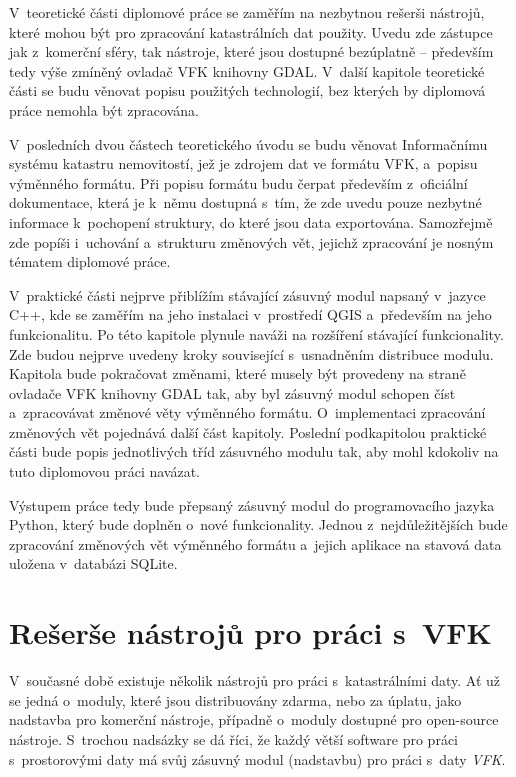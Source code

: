 \documentclass[a4paper,12pt,oneside]{book}
\begin{document}
V~teoretické části diplomové práce se zaměřím na nezbytnou rešerši nástrojů, které mohou být pro zpracování katastrálních dat použity. Uvedu zde zástupce jak z~komerční sféry, tak nástroje, které jsou dostupné bezúplatně -- především  tedy výše zmíněný ovladač VFK knihovny GDAL. V~další kapitole teoretické části se budu věnovat popisu použitých technologií, bez kterých by diplomová práce nemohla být zpracována. 

V~posledních dvou částech teoretického úvodu se budu věnovat Informačnímu systému katastru nemovitostí, jež je zdrojem dat ve formátu VFK, a~popisu výměnného formátu. Při popisu formátu budu čerpat především z~oficiální dokumentace, která je k~němu dostupná s~tím, že zde uvedu pouze nezbytné informace k~pochopení struktury, do které jsou data exportována. Samozřejmě zde popíši i~uchování a~strukturu změnových vět, jejichž zpracování je nosným tématem diplomové práce.

V~praktické části nejprve přiblížím stávající zásuvný modul napsaný v~jazyce C++, kde se zaměřím na jeho instalaci v~prostředí QGIS a~především na jeho funkcionalitu. Po této kapitole plynule naváži na rozšíření stávající funkcionality. Zde budou nejprve uvedeny kroky související s~usnadněním distribuce modulu. Kapitola bude pokračovat změnami, které musely být provedeny na straně ovladače VFK knihovny GDAL tak, aby byl zásuvný modul schopen číst a~zpracovávat změnové věty výměnného formátu. O~implementaci zpracování změnových vět pojednává dal\-ší část kapitoly. Poslední podkapitolou praktické části bude popis jednotlivých tříd zásuvného modulu tak, aby mohl kdokoliv na tuto diplomovou práci navázat.

Výstupem práce tedy bude přepsaný zásuvný modul do programovacího jazyka Python, který bude doplněn o~nové funkcionality. Jednou z~nejdůležitějších bude zpracování změnových vět výměnného formátu a~jejich aplikace na stavová data uložena v~databázi SQLite.


\clearpage
\rhead{{\rightmark}}
\chapter{Rešerše nástrojů pro práci s~VFK}

V~současné době existuje několik nástrojů pro práci s~katastrálními daty. Ať už se jedná o~moduly, které jsou distribuovány zdarma, nebo za úplatu,  jako nadstavba pro komerční nástroje, případně o~moduly dostupné pro open-source nástroje. S~trochou nadsázky se dá říci, že každý větší software pro práci s~prostorovými daty má svůj zásuvný modul (nadstavbu) pro práci s~daty \textit{VFK}.
\end{document}
